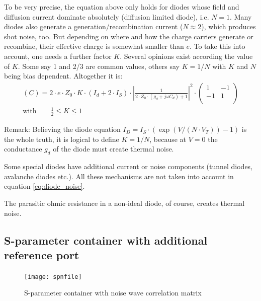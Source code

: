 \addvspace{12pt}

To be very precise, the equation above only holds for diodes whose
field and diffusion current dominate absolutely (diffusion limited
diode), i.e. $N=1$.  Many diodes also generate a
generation/recombination current ($N\approx 2$), which produces shot
noise, too.  But depending on where and how the charge carriers
generate or recombine, their effective charge is somewhat smaller than
$e$.  To take this into account, one needs a further factor $K$.
Several opinions exist according the value of $K$.  Some say 1 and 2/3
are common values, others say $K=1/N$ with $K$ and $N$ being bias
dependent.  Altogether it is:
\begin{equation}
\begin{split}
(\underline{C})
 = 2\cdot e\cdot Z_0\cdot K\cdot \left(I_{d} + 2\cdot I_{S}\right)\cdot
    \left| \frac{1}{2\cdot Z_0\cdot (g_d+j\omega C_d) + 1}\right|^2 \cdot
\begin{pmatrix}
   1 & -1\\
  -1 &  1\\
\end{pmatrix}\\
\text{with}\qquad\frac{1}{2}\le K \le 1
\end{split}
\label{eq:diode_noise}
\end{equation}

Remark: Believing the diode equation $I_D = I_S\cdot (\exp(V/(N\cdot
V_T)) - 1)$ is the whole truth, it is logical to define $K=1/N$,
because at $V=0$ the conductance $g_d$ of the diode must create
thermal noise.

\addvspace{12pt}

Some special diodes have additional current or noise components
(tunnel diodes, avalanche diodes etc.).  All these mechanisms are not
taken into account in equation \eqref{eq:diode_noise}.

\addvspace{12pt}

The parasitic ohmic resistance in a non-ideal diode, of course,
creates thermal noise.

\subsection{S-parameter container with additional reference port}

\begin{figure}[ht]
\begin{center}
\texttt{[image: spnfile]}
\end{center}
\caption{S-parameter container with noise wave correlation matrix}
\label{fig:spnfile}
\end{figure}
\FloatBarrier

